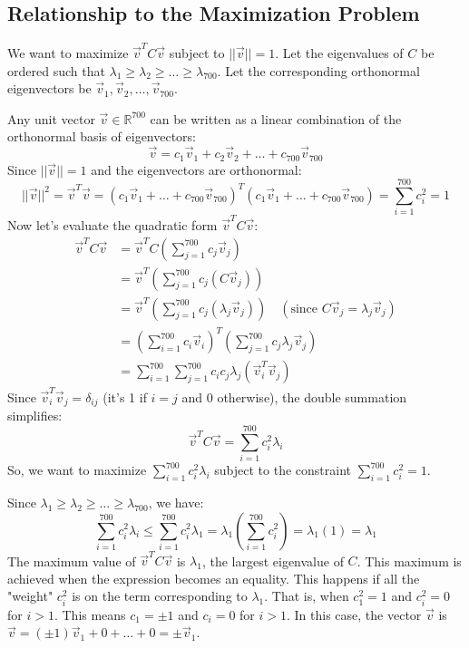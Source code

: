 \documentclass{report}
\begin{document}
\subsection{Relationship to the Maximization Problem}
We want to maximize $\vec{v}^T C \vec{v}$ subject to $||\vec{v}||=1$.
Let the eigenvalues of $C$ be ordered such that $\lambda_1 \ge \lambda_2 \ge \dots \ge \lambda_{700}$.
Let the corresponding orthonormal eigenvectors be $\vec{v}_1, \vec{v}_2, \dots, \vec{v}_{700}$.

Any unit vector $\vec{v} \in \mathbb{R}^{700}$ can be written as a linear combination of the orthonormal basis of eigenvectors:
\[
	\vec{v} = c_1 \vec{v}_1 + c_2 \vec{v}_2 + \dots + c_{700} \vec{v}_{700}
\]
Since $||\vec{v}||=1$ and the eigenvectors are orthonormal:
\[
	||\vec{v}||^2 = \vec{v}^T \vec{v} = (c_1 \vec{v}_1 + \dots + c_{700} \vec{v}_{700})^T (c_1 \vec{v}_1 + \dots + c_{700} \vec{v}_{700}) = \sum_{i=1}^{700} c_i^2 = 1
\]
Now let's evaluate the quadratic form $\vec{v}^T C \vec{v}$:
\begin{align*} \vec{v}^T C \vec{v} &= \vec{v}^T C \left( \sum_{j=1}^{700} c_j \vec{v}_j \right) \\ &= \vec{v}^T \left( \sum_{j=1}^{700} c_j (C \vec{v}_j) \right) \\ &= \vec{v}^T \left( \sum_{j=1}^{700} c_j (\lambda_j \vec{v}_j) \right) \quad (\text{since } C\vec{v}_j = \lambda_j \vec{v}_j) \\ &= \left( \sum_{i=1}^{700} c_i \vec{v}_i \right)^T \left( \sum_{j=1}^{700} c_j \lambda_j \vec{v}_j \right) \\ &= \sum_{i=1}^{700} \sum_{j=1}^{700} c_i c_j \lambda_j (\vec{v}_i^T \vec{v}_j) \end{align*}
Since $\vec{v}_i^T \vec{v}_j = \delta_{ij}$ (it's 1 if $i=j$ and 0 otherwise), the double summation simplifies:
\[
	\vec{v}^T C \vec{v} = \sum_{i=1}^{700} c_i^2 \lambda_i
\]
So, we want to maximize $\sum_{i=1}^{700} c_i^2 \lambda_i$ subject to the constraint $\sum_{i=1}^{700} c_i^2 = 1$.

Since $\lambda_1 \ge \lambda_2 \ge \dots \ge \lambda_{700}$, we have:
\[
	\sum_{i=1}^{700} c_i^2 \lambda_i \le \sum_{i=1}^{700} c_i^2 \lambda_1 = \lambda_1 \left( \sum_{i=1}^{700} c_i^2 \right) = \lambda_1 (1) = \lambda_1
\]
The maximum value of $\vec{v}^T C \vec{v}$ is $\lambda_1$, the largest eigenvalue of $C$.
This maximum is achieved when the expression becomes an equality. This happens if all the "weight" $c_i^2$ is on the term corresponding to $\lambda_1$. That is, when $c_1^2 = 1$ and $c_i^2 = 0$ for $i > 1$.
This means $c_1 = \pm 1$ and $c_i = 0$ for $i > 1$.
In this case, the vector $\vec{v}$ is $\vec{v} = (\pm 1) \vec{v}_1 + 0 + \dots + 0 = \pm \vec{v}_1$.
\end{document}
